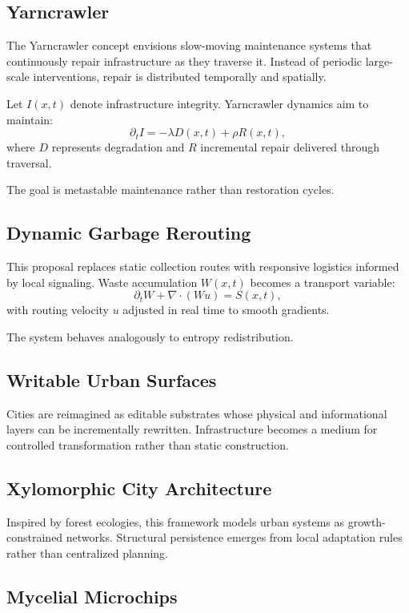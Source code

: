 \documentclass[12pt]{article}
\begin{document}
\subsection{Yarncrawler}

The Yarncrawler concept envisions slow-moving maintenance systems that continuously repair infrastructure as they traverse it. Instead of periodic large-scale interventions, repair is distributed temporally and spatially.

Let $I(x,t)$ denote infrastructure integrity. Yarncrawler dynamics aim to maintain:
\[
\partial_t I = -\lambda D(x,t) + \rho R(x,t),
\]
where $D$ represents degradation and $R$ incremental repair delivered through traversal.

The goal is metastable maintenance rather than restoration cycles.

\subsection{Dynamic Garbage Rerouting}

This proposal replaces static collection routes with responsive logistics informed by local signaling. Waste accumulation $W(x,t)$ becomes a transport variable:
\[
\partial_t W + \nabla\cdot(Wu) = S(x,t),
\]
with routing velocity $u$ adjusted in real time to smooth gradients.

The system behaves analogously to entropy redistribution.

\subsection{Writable Urban Surfaces}

Cities are reimagined as editable substrates whose physical and informational layers can be incrementally rewritten. Infrastructure becomes a medium for controlled transformation rather than static construction.

\subsection{Xylomorphic City Architecture}

Inspired by forest ecologies, this framework models urban systems as growth-constrained networks. Structural persistence emerges from local adaptation rules rather than centralized planning.

\subsection{Mycelial Microchips}
\end{document}
